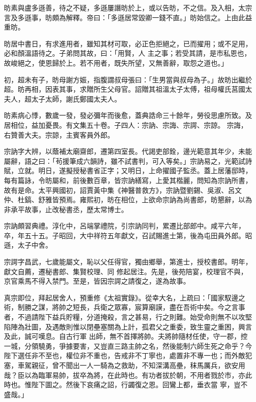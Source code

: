 \begin{pinyinscope}
 昉素與盧多遜善，待之不疑，多遜屢譖昉於上，或以告昉，不之信。及入相，太宗言及多遜事，昉頗為解釋。帝曰：「多遜居常毀卿一錢不直。」昉始信之。上由此益重昉。



 昉居中書日，有求進用者，雖知其材可取，必正色拒絕之，已而擢用；或不足用，必和顏溫語待之。子弟問其故，曰：「用賢，人
 主之事；若受其請，是市私恩也，故峻絕之，使恩歸於上。若不用者，既失所望，又無善辭，取怨之道也。」



 初，超未有子，昉母謝方娠，指腹謂叔母張曰：「生男當與叔母為子。」故昉出繼於超。昉再相，因表其事，求贈所生父母官。詔贈其祖溫太子太傅，祖母權氏莒國太夫人，超太子太師，謝氏鄭國太夫人。



 昉素病心悸，數歲一發，發必彌年而後愈，蓋典誥命三十餘年，勞役思慮所致。及居相位，益加憂畏。有文集五十卷。子四人：宗訥、宗誨、宗諤、宗諒。
 宗誨，右贊善大夫。宗諒，主賓客員外郎。



 宗訥字大辨，以蔭補太廟齋郎，遷第四室長。代謁吏部銓，邊光範意其年少，未能屬辭，語之曰：「茍援筆成六韻詩，雖不試書判，可入等矣。」宗訥易之，光範試詩賦，立就。明日，遂擬授秘書省正字；又明日，上命擢國子監丞。蓋上居藩邸時，每有篇詠，令昉屬和，前後數百章，皆宗訥繕寫，上愛其楷麗，問知為宗訥所書，故有是命。太平興國初，詔賈黃中集《神醫普救方》，宗訥暨劉錫、吳淑、呂文
 仲、杜鎬、舒雅皆預焉。雍熙初，昉在相位，上欲命宗訥為尚書郎，昉懇辭，以為非承平故事，止改秘書丞，歷太常博士。



 宗訥頗習典禮。淳化中，呂端掌禮院，引宗訥同判，累遷比部郎中。咸平六年，卒，年五十五。子昭回，大中祥符五年獻文，召試賜進士第，後為屯田員外郎。昭遜，太子中舍。



 宗諤字昌武，七歲能屬文，恥以父任得官，獨由鄉舉，第進士，授校書郎。明年，獻文自薦，遷秘書郎、集賢校理、同
 修起居注。先是，後苑陪宴，校理官不與，京官乘馬不得入禁門。至是，皆因宗諤之請復之，遂為故事。



 真宗即位，拜起居舍人，預重修《太祖實錄》。從幸大名，上疏曰：「國家馭邊之術，制勝之謀，將帥之短長，兵衛之眾寡，宸算廟謨，盡在吾術中矣。今之言事者，不過請陛下益兵貯糧，分道掩殺，言之甚易，行之則難。始受命則無不以攻堅陷陣為壯圖，及遇敵則惟以閉壘塞關為上計，孤君父之重委，致生靈之重困，興言及此，誠可嘆息。自古行軍
 出師，無不首擇將帥。夫將帥隨材任使，守一郡，控一城，分領驍勇，爭據要害，又豈直三路主帥之名，然後能制六師生死之命乎？今陛下選任非不至也，權位非不重也，告戒非不丁寧也，處置非不專一也；而外敵犯塞，車駕親征，曾不聞出一人一騎為之救助，不知深溝高壘，秣馬厲兵，欲安用哉？臣以為臨軍易帥，拔卒為將，在此時也。有功者拔於朝，不用者戮於市，亦此時也。惟陛下圖之。然後下哀痛之詔，行蠲復之恩。回鸞上都，垂衣當
 寧，豈不盛哉。」




\end{pinyinscope}
